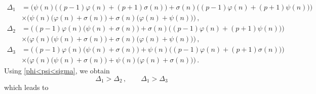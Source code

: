 \documentclass[12pt]{article}
\begin{document}
\begin{align*}
\Delta_1&=\Big(\psi(n)\big((p-1)\varphi(n)+(p+1)\sigma(n)\big)+\sigma(n)\big((p-1)\varphi(n)+(p+1)\psi(n)\big)\Big)\\
&\times\Big(\psi(n)\big(\varphi(n)+\sigma(n)\big)+\sigma(n)\big(\varphi(n)+\psi(n)\big)\Big)\,,\\
\Delta_2&=\Big((p-1)\varphi(n)\big(\psi(n)+\sigma(n)\big)+\sigma(n)\big((p-1)\varphi(n)+(p+1)\psi(n)\big)\Big)\\
&\times\Big(\varphi(n)\big(\psi(n)+\sigma(n)\big)+\sigma(n)\big(\varphi(n)+\psi(n)\big)\Big)\,,\\
\Delta_3&=\Big((p-1)\varphi(n)\big(\psi(n)+\sigma(n)\big)+\psi(n)\big((p-1)\varphi(n)+(p+1)\sigma(n)\big)\Big)\\
&\times\Big(\varphi(n)\big(\psi(n)+\sigma(n)\big)+\psi(n)\big(\varphi(n)+\sigma(n)\big)\Big)\,.
\end{align*}
Using \eqref{phi<psi<sigma}, we obtain  
\begin{equation*}
\Delta_1>\Delta_2\,, \qquad \Delta_1>\Delta_3
\end{equation*}
which leads to
\end{document}
